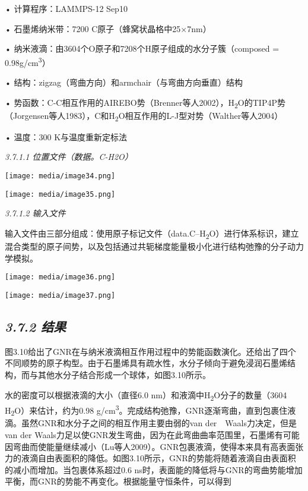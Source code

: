 \documentclass[
]{article}
\begin{document}
• 计算程序：LAMMPS-12 Sep10

• 石墨烯纳米带：7200 C原子（蜂窝状晶格中25×7nm）

• 纳米液滴：由3604个O原子和7208个H原子组成的水分子簇（composed =
0.98g/cm\textsuperscript{3}）

• 结构：zigzag（弯曲方向）和armchair（与弯曲方向垂直）结构

•
势函数：C-C相互作用的AIREBO势（Brenner等人2002），H\textsubscript{2}O的TIP4P势（Jorgensen等人1983），C和H\textsubscript{2}O相互作用的L-J型对势（Walther等人2004）

• 温度：300 K与温度重新定标法

\emph{3.7.1.1 位置文件（数据。C-H2O）}

\texttt{[image: media/image34.png]}

\texttt{[image: media/image35.png]}

\emph{3.7.1.2 输入文件}

输入文件由三部分组成：使用原子标记文件（data.C--H\textsubscript{2}O）进行体系标识，建立混合类型的原子间势，以及包括通过共轭梯度能量极小化进行结构弛豫的分子动力学模拟。

\texttt{[image: media/image36.png]}

\texttt{[image: media/image37.png]}

\hypertarget{ux7ed3ux679c-6}{%
\subsection{\texorpdfstring{\emph{3.7.2
结果}}{3.7.2 结果}}\label{ux7ed3ux679c-6}}

图3.10给出了GNR在与纳米液滴相互作用过程中的势能函数演化。还给出了四个不同顺势的原子构型。由于石墨烯具有疏水性，水分子倾向于避免浸润石墨烯结构，而与其他水分子结合形成一个球体，如图3.10所示。

水的密度可以根据液滴的大小（直径6.0
nm）和液滴中H\textsubscript{2}O分子的数量（3604
H\textsubscript{2}O）来估计，约为0.98
g/cm\textsuperscript{3}。完成结构弛豫，GNR逐渐弯曲，直到包裹住液滴。虽然GNR和水分子之间的相互作用主要由弱的van
der　Waals力决定，但是van der
Waals力足以使GNR发生弯曲，因为在此弯曲曲率范围里，石墨烯有可能因弯曲而使能量继续减小（Lu等人2009）。GNR包裹液滴，使得本来具有高表面张力的液滴自由表面积的降低。如图3.10所示，GNR的势能将随着液滴自由表面积的减小而增加。当包裹体系超过0.6
ns时，表面能的降低将与GNR的弯曲势能增加平衡，而GNR的势能不再变化。根据能量守恒条件，可以得到
\end{document}
